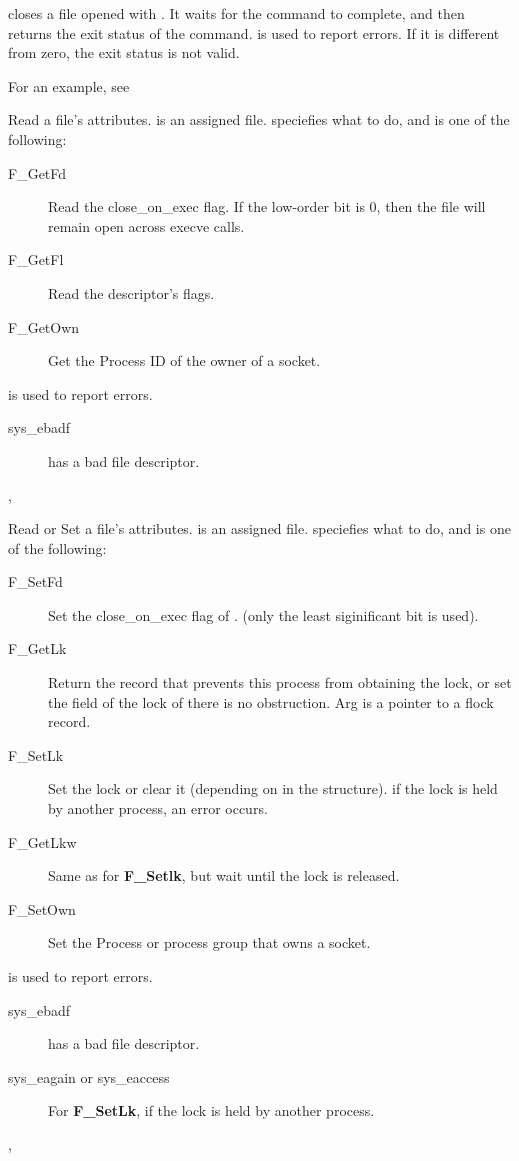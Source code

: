 

{  closes a file opened with . It waits for the
command to complete, and then returns the exit status of the command. 
}
{ is used to report errors. If it is different from zero,
the exit status is not valid.}
{}

For an example, see 

{
Read a file's attributes.  is an assigned file.
 speciefies what to do, and is one of the following:
\begin{description}
\item[F\_GetFd] Read the close\_on\_exec flag. If the low-order bit is 0, then
the file will remain open across execve calls.
\item[F\_GetFl] Read the descriptor's flags.
\item[F\_GetOwn] Get the Process ID of the owner of a socket.
\end{description}
}
{
 is used to report errors.
\begin{description}
\item[sys\_ebadf]  has a bad file descriptor.
\end{description}
}
{,  }

{
Read or Set a file's attributes.  is an assigned file.
 speciefies what to do, and is one of the following:
\begin{description}
\item[F\_SetFd] Set the close\_on\_exec flag of . (only the least
siginificant bit is used).
\item[F\_GetLk] Return the  record that prevents this process from
obtaining the lock, or set the  field of the lock of there is no
obstruction. Arg is a pointer to a flock record.
\item[F\_SetLk] Set the lock or clear it (depending on  in the
 structure). if the lock is held by another process, an error
occurs.
\item[F\_GetLkw] Same as for \textbf{F\_Setlk}, but wait until the lock is
released.
\item[F\_SetOwn] Set the Process or process group that owns a socket.
\end{description}
}
{
 is used to report errors.
\begin{description}
\item[sys\_ebadf]  has a bad file descriptor.
\item[sys\_eagain or sys\_eaccess] For \textbf{F\_SetLk}, if the lock is
held by another process.
\end{description}
}
{,  }

